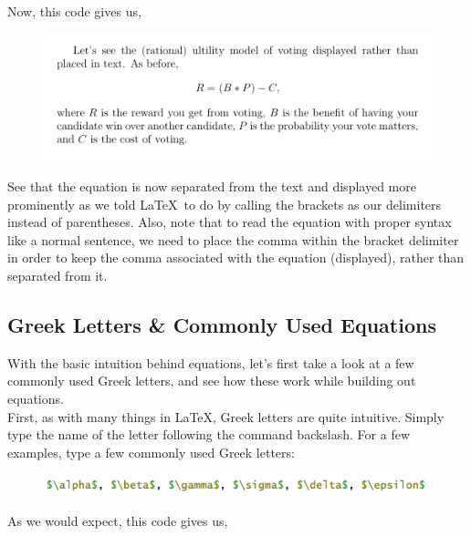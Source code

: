 \documentclass[11pt]{article}
\newcommand{\forceindent}{\leavevmode{\parindent=1.5em\indent}} %
\begin{document}
Now, this code gives us, \\

\begin{figure}[!h]
	\includegraphics[scale=.5]{OUT3} \\
	\centering
\end{figure}

See that the equation is now separated from the text and displayed more prominently as we told \LaTeX\ to do by calling the brackets as our delimiters instead of parentheses. Also, note that to read the equation with proper syntax like a normal sentence, we need to place the comma within the bracket delimiter in order to keep the comma associated with the equation (displayed), rather than separated from it. \\

\subsection{Greek Letters \& Commonly Used Equations}

\forceindent With the basic intuition behind equations, let's first take a look at a few commonly used Greek letters, and see how these work while building out equations. \\

First, as with many things in \LaTeX, Greek letters are quite intuitive. Simply type the name of the letter following the command backslash. For a few examples, type a few commonly used Greek letters:

\begin{figure}[!h]
	\includegraphics[scale=.5]{CODE4} \\
	\centering
\end{figure}

\newpage

As we would expect, this code gives us, \\
\end{document}
